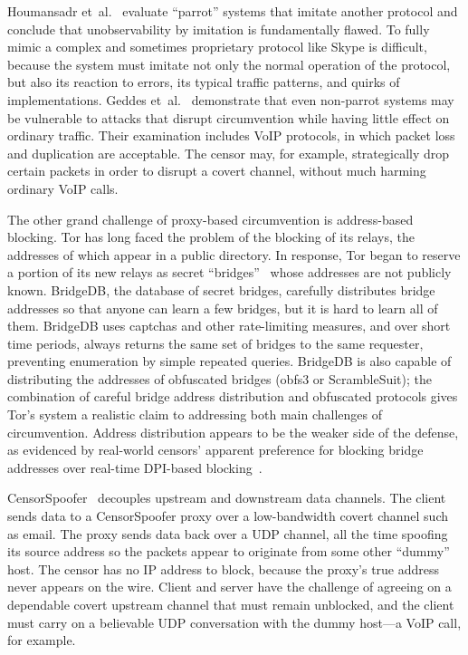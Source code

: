 \documentclass[conference]{IEEEtran}
\begin{document}
Houmansadr et~al.~\cite{parrot} evaluate ``parrot'' systems that imitate another protocol
and conclude that unobservability by imitation is fundamentally flawed.
To fully mimic a complex and sometimes proprietary protocol like Skype
is difficult,
because the system must imitate not only the normal operation of the protocol,
but also its reaction to errors,
its typical traffic patterns, and quirks of implementations.
Geddes et~al.~\cite{acks}
demonstrate that even non-parrot systems may be vulnerable to
attacks that disrupt circumvention while having little effect
on ordinary traffic.
Their examination includes VoIP protocols,
in which packet loss and duplication are acceptable.
The censor may, for example, strategically drop certain packets
in order to disrupt a covert channel, without much harming ordinary VoIP calls.


The other grand challenge of proxy-based circumvention is address-based blocking.
Tor has long faced the problem of the blocking of its relays,
the addresses of which appear in a public directory.
In response, Tor began to reserve a portion of its
new relays as secret ``bridges''~\cite{tor-blocking}
whose addresses are not publicly known.
BridgeDB, the database of secret bridges,
carefully distributes bridge addresses
so that anyone can learn a few bridges, but it is hard to learn all of them.
BridgeDB uses captchas and other rate-limiting measures,
and over short time periods,
always returns the same set of bridges to the same requester,
preventing enumeration by simple repeated queries.
BridgeDB is also capable of distributing the addresses
of obfuscated bridges (obfs3 or ScrambleSuit);
the combination
of careful bridge address distribution and obfuscated protocols
gives Tor's system a realistic claim to addressing both main challenges of circumvention.
Address distribution appears to be the weaker side of the defense,
as evidenced by real-world censors' apparent preference for
blocking bridge addresses over real-time DPI-based blocking~\cite{foci12-winter}.

CensorSpoofer~\cite{censorspoofer}
decouples upstream and downstream data channels.
The client sends data to a CensorSpoofer proxy over a low-bandwidth covert channel such as email.
The proxy sends data back over a UDP channel, all the time
spoofing its source address so the packets appear to originate from some other ``dummy'' host.
The censor has no IP address to block, because the proxy's true address never appears on the wire.
Client and server have the challenge of agreeing on a dependable covert upstream channel
that must remain unblocked,
and the client must carry on a believable UDP conversation with the dummy host---a
VoIP call, for example.
\end{document}
